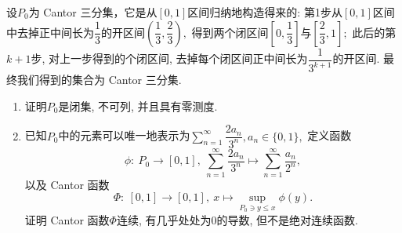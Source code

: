 \begin{question}[points = 10]
  设$P_0$为 Cantor 三分集，它是从$[0, 1]$区间归纳地构造得来的: 第1步从$[0, 1]$区间中去掉正中间长为$\dfrac{1}{3}$的开区间$\left( \dfrac{1}{3}, \dfrac{2}{3} \right),$ 得到两个闭区间$\left[ 0, \dfrac{1}{3} \right]$与$\left[ \dfrac{2}{3}, 1 \right];$ 此后的第$k + 1$步, 对上一步得到的个闭区间, 去掉每个闭区间正中间长为$\dfrac{1}{3^{k+1}}$的开区间. 最终我们得到的集合为 Cantor 三分集.
  \begin{enumerate}
    \item 证明$P_0$是闭集, 不可列, 并且具有零测度.
    \item 已知$P_0$中的元素可以唯一地表示为$\displaystyle \sum\limits_{n=1}^{\infty} \dfrac{2a_n}{3^n}, a_n \in \{0, 1\},$ 定义函数
    $$
    \phi: ~ P_0 \rightarrow [0, 1], ~ \sum\limits_{n=1}^{\infty} \dfrac{2a_n}{3^n} \mapsto \sum\limits_{n=1}^{\infty} \dfrac{a_n}{2^n},
    $$
    以及 Cantor 函数
    $$
    \Phi: ~ [0, 1] \rightarrow [0, 1], ~ x \mapsto \sup\limits_{P_0 \ni y \leqslant x} \phi(y).
    $$
    证明 Cantor 函数$\Phi$连续, 有几乎处处为0的导数, 但不是绝对连续函数.
  \end{enumerate}

\end{question}

